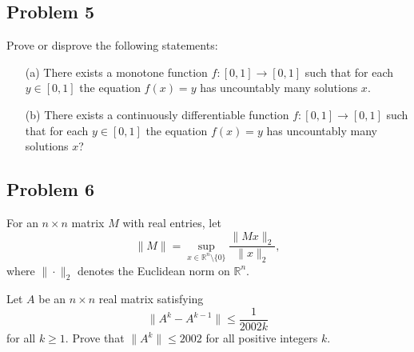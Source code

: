 \documentclass{article}
\begin{document}
\subsection*{Problem 5}
Prove or disprove the following statements:
\begin{enumerate}
\item[(a)] There exists a monotone function $f: [0,1] \to [0,1]$ such that for each $y \in [0,1]$
 the equation $f(x) = y$ has uncountably many solutions $x$.
\item[(b)] There exists a continuously differentiable function $f: [0,1] \to [0,1]$ such that
for each $y \in [0,1]$ the equation $f(x) = y$ has uncountably many solutions $x$?
\end{enumerate}

\subsection*{Problem 6}
For an \( n \times n \) matrix \( M \) with real entries, let
\[
\|M\| = \sup_{x \in \mathbb{R}^n \setminus \{0\}} \frac{\|Mx\|_2}{\|x\|_2},
\]
where \( \|\cdot\|_2 \) denotes the Euclidean norm on \( \mathbb{R}^n \).

Let $A$ be an $n \times n$ real matrix satisfying
\[
\|A^k - A^{k-1}\| \leq \frac{1}{2002k}
\]
for all $k \geq 1$. Prove that $\|A^k\| \leq 2002$ for all positive integers $k$.
\end{document}
